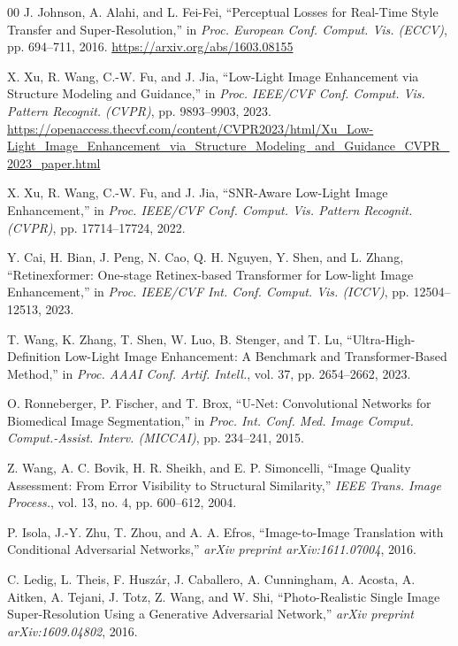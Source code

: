 \documentclass[sigconf]{acmart}
\begin{document}
\begin{thebibliography}{00}
J. Johnson, A. Alahi, and L. Fei-Fei, ``Perceptual Losses for Real-Time Style Transfer and Super-Resolution,'' in \textit{Proc. European Conf. Comput. Vis. (ECCV)}, pp. 694--711, 2016. \url{https://arxiv.org/abs/1603.08155}

X. Xu, R. Wang, C.-W. Fu, and J. Jia, ``Low-Light Image Enhancement via Structure Modeling and Guidance,'' in \textit{Proc. IEEE/CVF Conf. Comput. Vis. Pattern Recognit. (CVPR)}, pp. 9893--9903, 2023. \url{https://openaccess.thecvf.com/content/CVPR2023/html/Xu_Low-Light_Image_Enhancement_via_Structure_Modeling_and_Guidance_CVPR_2023_paper.html}

X. Xu, R. Wang, C.-W. Fu, and J. Jia, ``SNR-Aware Low-Light Image Enhancement,'' in \textit{Proc. IEEE/CVF Conf. Comput. Vis. Pattern Recognit. (CVPR)}, pp. 17714--17724, 2022.

Y. Cai, H. Bian, J. Peng, N. Cao, Q. H. Nguyen, Y. Shen, and L. Zhang, ``Retinexformer: One-stage Retinex-based Transformer for Low-light Image Enhancement,'' in \textit{Proc. IEEE/CVF Int. Conf. Comput. Vis. (ICCV)}, pp. 12504--12513, 2023.

T. Wang, K. Zhang, T. Shen, W. Luo, B. Stenger, and T. Lu, ``Ultra-High-Definition Low-Light Image Enhancement: A Benchmark and Transformer-Based Method,'' in \textit{Proc. AAAI Conf. Artif. Intell.}, vol. 37, pp. 2654--2662, 2023.

O. Ronneberger, P. Fischer, and T. Brox, ``U-Net: Convolutional Networks for Biomedical Image Segmentation,'' in \textit{Proc. Int. Conf. Med. Image Comput. Comput.-Assist. Interv. (MICCAI)}, pp. 234--241, 2015.

Z. Wang, A. C. Bovik, H. R. Sheikh, and E. P. Simoncelli, ``Image Quality Assessment: From Error Visibility to Structural Similarity,'' \textit{IEEE Trans. Image Process.}, vol. 13, no. 4, pp. 600--612, 2004.

P. Isola, J.-Y. Zhu, T. Zhou, and A. A. Efros, ``Image-to-Image Translation with Conditional Adversarial Networks,'' \textit{arXiv preprint arXiv:1611.07004}, 2016.

C. Ledig, L. Theis, F. Husz{\'a}r, J. Caballero, A. Cunningham, A. Acosta, A. Aitken, A. Tejani, J. Totz, Z. Wang, and W. Shi, ``Photo-Realistic Single Image Super-Resolution Using a Generative Adversarial Network,'' \textit{arXiv preprint arXiv:1609.04802}, 2016.


\end{thebibliography}
\end{document}

